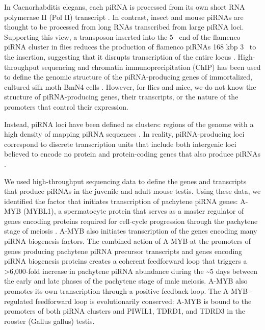   In Caenorhabditis elegans, each piRNA is processed from its own short RNA polymerase II (Pol II) transcript \citep{Gu2012}. In contrast, insect and mouse piRNAs are thought to be processed from long RNAs transcribed from large piRNA loci. Supporting this view, a transposon inserted into the 5\textprime~ end of the flamenco piRNA cluster in flies reduces the production of flamenco piRNAs 168 kbp 3\textprime~ to the insertion, suggesting that it disrupts transcription of the entire locus \citep{Brennecke2007}. High-throughput sequencing and chromatin immunoprecipitation (ChIP) has been used to define the genomic structure of the piRNA-producing genes of immortalized, cultured silk moth BmN4 cells \citep{Kawaoka2012}. However, for flies and mice, we do not know the structure of piRNA-producing genes, their transcripts, or the nature of the promoters that control their expression.

  Instead, piRNA loci have been defined as clusters: regions of the genome with a high density of mapping piRNA sequences \citep{Aravin2006,Girard2006, Grivna2006,Lau2006,Brennecke2007,Ro2007}. In reality, piRNA-producing loci correspond to discrete transcription units that include both intergenic loci believed to encode no protein \citep{Brennecke2007,Brennecke2008, Vourekas2012} and protein-coding genes that also produce piRNAs \citep{Aravin2007, Robine2009, Saito2009}.

  We used high-throughput sequencing data to define the genes and transcripts that produce piRNAs in the juvenile and adult mouse testis. Using these data, we identified the factor that initiates transcription of pachytene piRNA genes: A-MYB (MYBL1), a spermatocyte protein that serves as a master regulator of genes encoding proteins required for cell-cycle progression through the pachytene stage of meiosis \citep{Trauth1994, Bolcun-Filas2011}. A-MYB also initiates transcription of the genes encoding many piRNA biogenesis factors. The combined action of A-MYB at the promoters of genes producing pachytene piRNA precursor transcripts and genes encoding piRNA biogenesis proteins creates a coherent feedforward loop that triggers a >6,000-fold increase in pachytene piRNA abundance during the \textasciitilde5 days between the early and late phases of the pachytene stage of male meiosis. A-MYB also promotes its own transcription through a positive feedback loop. The A-MYB-regulated feedforward loop is evolutionarily conserved: A-MYB is bound to the promoters of both piRNA clusters and PIWIL1, TDRD1, and TDRD3 in the rooster (Gallus gallus) testis.

